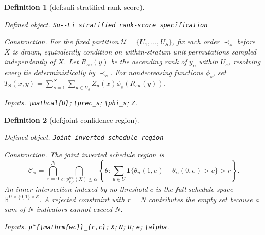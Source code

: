 \documentclass{article}
\newtheorem{definition}{Definition}
\begin{document}
\begin{definition}[def:suli-stratified-rank-score]\label{def:suli-stratified-rank-score}
\par\smallskip\noindent\emph{Defined object.} \texttt{Su-\allowbreak{}-\allowbreak{}Li stratified rank-\allowbreak{}score specification}
\par\smallskip\noindent\emph{Construction.} For the fixed partition \(\mathcal{U}=\{U_1,\ldots,U_S\}\), fix each order \(\prec_s\) before \(X\) is drawn, equivalently condition on within-stratum unit permutations sampled independently of \(X\). Let \(R_{su}(y)\) be the ascending rank of \(y_u\) within \(U_s\), resolving every tie deterministically by \(\prec_s\). For nondecreasing functions \(\phi_s\), set \(T_{\mathrm S}(x,y)=\sum_{s=1}^{S}\sum_{u\in U_s}Z_u(x)\phi_s(R_{su}(y))\).
\par\smallskip\noindent\emph{Inputs.} \texttt{\textbackslash{}\allowbreak{}mathcal\{U\}\allowbreak{}}; \texttt{\textbackslash{}\allowbreak{}prec\_\allowbreak{}s}; \texttt{\textbackslash{}\allowbreak{}phi\_\allowbreak{}s}; \texttt{Z}.
\end{definition}

\begin{definition}[def:joint-confidence-region]\label{def:joint-confidence-region}
\par\smallskip\noindent\emph{Defined object.} \texttt{Joint inverted schedule region}
\par\smallskip\noindent\emph{Construction.} The joint inverted schedule region is
\[
\mathcal C_{\alpha}
=\bigcap_{r=0}^{N}
  \bigcap_{c:\,p^{\mathrm{wc}}_{r,c}(X)\leq\alpha}
  \left\{\theta:
  \sum_{u\in U}\mathbf 1\{\theta_u(1,e)-\theta_u(0,e)>c\}>r
  \right\}.
\]
An inner intersection indexed by no threshold \(c\) is the full schedule space
\(\mathbb R^{U\times\{0,1\}\times\mathcal E}\).  A rejected constraint with
\(r=N\) contributes the empty set because a sum of \(N\) indicators cannot
exceed \(N\).
\par\smallskip\noindent\emph{Inputs.} \texttt{p\textasciicircum{}\{\textbackslash{}\allowbreak{}mathrm\{wc\}\allowbreak{}\}\allowbreak{}\_\allowbreak{}\{r,\allowbreak{}c\}\allowbreak{}}; \texttt{X}; \texttt{N}; \texttt{U}; \texttt{e}; \texttt{\textbackslash{}\allowbreak{}alpha}.
\end{definition}
\end{document}
